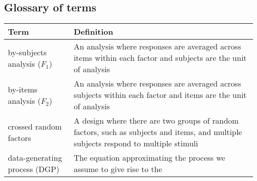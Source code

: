\clearpage
\makeatletter
\efloat@restorefloats
\makeatother


\begin{appendix}
\hypertarget{glossary-of-terms}{%
\section{Glossary of terms}\label{glossary-of-terms}}

\begin{longtable}[]{@{}ll@{}}
\toprule
\begin{minipage}[b]{0.27\columnwidth}\raggedright
Term\strut
\end{minipage} & \begin{minipage}[b]{0.67\columnwidth}\raggedright
Definition\strut
\end{minipage}\tabularnewline
\midrule
\endhead
\begin{minipage}[t]{0.27\columnwidth}\raggedright
by-subjects analysis (\(F_1\))\strut
\end{minipage} & \begin{minipage}[t]{0.67\columnwidth}\raggedright
An analysis where responses are averaged across items within each factor
and subjects are the unit of analysis\strut
\end{minipage}\tabularnewline
\begin{minipage}[t]{0.27\columnwidth}\raggedright
by-items analysis (\(F_2\))\strut
\end{minipage} & \begin{minipage}[t]{0.67\columnwidth}\raggedright
An analysis where responses are averaged across subjects within each
factor and items are the unit of analysis\strut
\end{minipage}\tabularnewline
\begin{minipage}[t]{0.27\columnwidth}\raggedright
crossed random factors\strut
\end{minipage} & \begin{minipage}[t]{0.67\columnwidth}\raggedright
A design where there are two groups of random factors, such as subjects
and items, and multiple subjects respond to multiple stimuli\strut
\end{minipage}\tabularnewline
\begin{minipage}[t]{0.27\columnwidth}\raggedright
data-generating process (DGP)\strut
\end{minipage} & \begin{minipage}[t]{0.67\columnwidth}\raggedright
The equation approximating the process we assume to give rise to the

\end{minipage}
\end{longtable}
\end{appendix}
